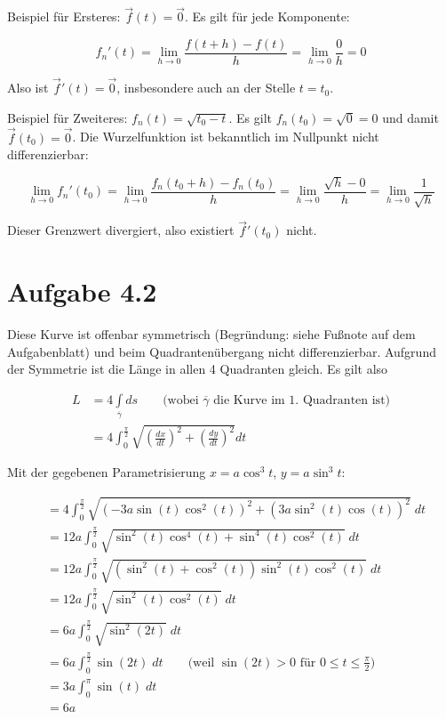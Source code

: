 \documentclass[a4paper,german,12pt,smallheadings]{scrartcl}
\begin{document}
\begin{enumerate}[(1)]
    Beispiel für Ersteres: $\vec{f}(t) = \vec{0}$. Es gilt für jede Komponente:

    \begin{equation*}
      f_n'(t) = \lim_{h \to 0} \frac{f(t + h) - f(t)}{h} = \lim_{h \to 0} \frac{0}{h} = 0
    \end{equation*}

    Also ist $\vec{f}'(t) = \vec{0}$, insbesondere auch an der Stelle $t = t_0$.

    Beispiel für Zweiteres: $f_n(t) = \sqrt{t_0-t}$. Es gilt $f_n(t_0) =
    \sqrt{0} = 0$ und damit $\vec{f}(t_0) = \vec{0}$. Die Wurzelfunktion ist
    bekanntlich im Nullpunkt nicht differenzierbar:

    \begin{equation*}
      \lim_{h \to 0} f_n'(t_0) = \lim_{h \to 0} \frac{f_n(t_0 + h) - f_n(t_0)}{h} = 
      \lim_{h \to 0} \frac{\sqrt{h} - 0}{h} = \lim_{h \to 0} \frac{1}{\sqrt{h}}
    \end{equation*}

    Dieser Grenzwert divergiert, also existiert $\vec{f}'(t_0)$ nicht.
\end{enumerate}

\section*{Aufgabe 4.2}

Diese Kurve ist offenbar symmetrisch (Begründung: siehe Fußnote auf dem
Aufgabenblatt) und beim Quadrantenübergang nicht differenzierbar. Aufgrund der
Symmetrie ist die Länge in allen 4 Quadranten gleich. Es gilt also

\begin{align*}
  L &= 4 \int\limits_{\overline{\gamma}}  ds \qquad \text{(wobei }\overline{\gamma}\text{ die Kurve im 1. Quadranten ist)} \\
    &= 4 \int_0^{\frac{\pi}{2}} \sqrt{\left(\frac{dx}{dt}\right)^2 + \left(\frac{dy}{dt}\right)^2} dt
\end{align*}

Mit der gegebenen Parametrisierung $x=a \cos^3 t$, $y = a \sin^3 t$:

\begin{align*}
  &= 4 \int_0^{\frac{\pi}{2}}   \sqrt{\left(-3a \sin(t) \cos^2(t) \right)^2 + \left(3a \sin^2(t) \cos(t)\right)^2} \; dt \\
  &= 12a \int_0^{\frac{\pi}{2}} \sqrt{\sin^2(t) \cos^4(t) + \sin^4(t) \cos^2(t)} \; dt \\
  &= 12a \int_0^{\frac{\pi}{2}} \sqrt{(\sin^2(t) + \cos^2(t)) \sin^2(t)\cos^2(t)} \; dt \\
  &= 12a \int_0^{\frac{\pi}{2}} \sqrt{\sin^2(t)\cos^2(t)} \; dt \\
  &= 6a \int_0^{\frac{\pi}{2}}  \sqrt{\sin^2(2t)} \; dt \\
  &= 6a \int_0^{\frac{\pi}{2}}  \sin(2t) \; dt \qquad \text{(weil $\sin(2t) > 0$ für $0 \le t \le \frac{\pi}{2}$)} \\
  &= 3a \int_0^{\pi}            \sin(t) \; dt \\
  &= 6a
\end{align*}
\end{document}
